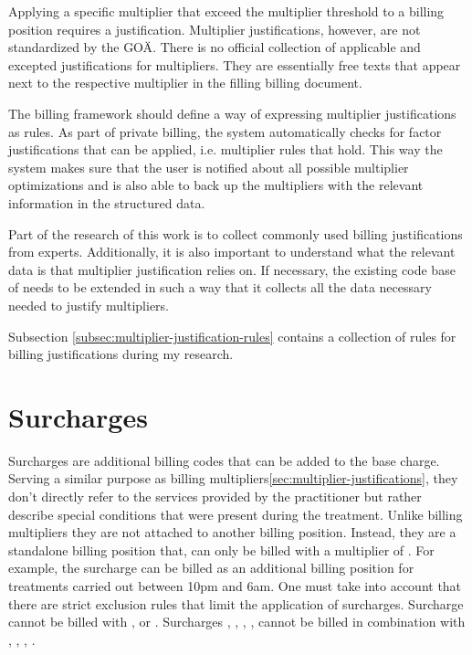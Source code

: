 Applying a specific multiplier that exceed the multiplier threshold to a billing position requires a justification.
Multiplier justifications, however, are not standardized by the GOÄ\cite[]{bruck1998kommentar}.
There is no official collection of applicable and excepted justifications for multipliers.
They are essentially free texts that appear next to the respective multiplier in the filling billing document.

The billing framework should define a way of expressing multiplier justifications as rules.
As part of private billing, the system automatically checks for factor justifications that can be applied, i.e. multiplier rules that hold.
This way the system makes sure that the user is notified about all possible multiplier optimizations and is also able to back up the multipliers with the relevant information in the structured data.

Part of the research of this work is to collect commonly used billing justifications from experts.
Additionally, it is also important to understand what the relevant data is that multiplier justification relies on.
If necessary, the existing code base of \AV needs to be extended in such a way that it collects all the data necessary needed to justify multipliers.

Subsection \ref{subsec:multiplier-justification-rules} contains a collection of rules for billing justifications during my research.


\section{Surcharges}\label{sec:surcharges}
Surcharges are additional billing codes that can be added to the base charge.
Serving a similar purpose as billing multipliers\ref{sec:multiplier-justifications}, they don't directly refer to the services provided by the practitioner but rather describe special conditions that were present during the treatment\cite{walter2008abrechnung}.
Unlike billing multipliers they are not attached to another billing position.
Instead, they are a standalone billing position that, can only be billed with a multiplier of .
For example, the surcharge  can be billed as an additional billing position for treatments carried out between 10pm and 6am.
One must take into account that there are strict exclusion rules that limit the application of surcharges\cite{kommentar2012zuschlage}.
Surcharge  cannot be billed with ,  or .
Surcharges , , , ,  cannot be billed in combination with , , , \cite{kommentar2012zuschlage}.

